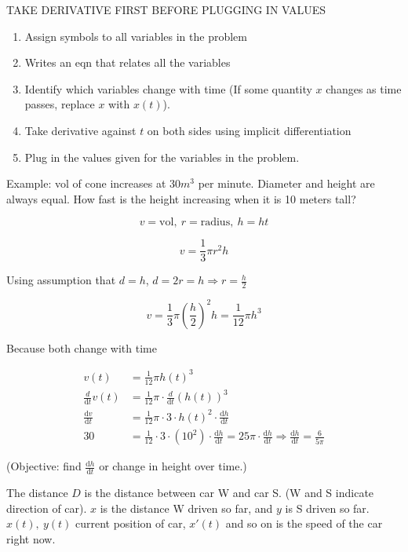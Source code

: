 \documentclass[12pt]{article}
\theoremstyle{plain}
\theoremstyle{remark}
\theoremstyle{definition}
\begin{document}
TAKE DERIVATIVE FIRST BEFORE PLUGGING IN VALUES

\begin{enumerate}
\def\labelenumi{\arabic{enumi}.}
\item
  Assign symbols to all variables in the problem
\item
  Writes an eqn that relates all the variables
\item
  Identify which variables change with time (If some quantity \(x\)
  changes as time passes, replace \(x\) with \(x(t)\)).
\item
  Take derivative against \(t\) on both sides using implicit
  differentiation
\item
  Plug in the values given for the variables in the problem.
\end{enumerate}

Example: vol of cone increases at 30\(m^{3}\) per minute. Diameter and
height are always equal. How fast is the height increasing when it is 10
meters tall?

\[v = \text{vol},\ r = \text{radius},\ h = ht\]

\[v = \frac{1}{3}\pi r^{2}h\]

Using assumption that \(d = h\),
\(d = 2r = h \Rightarrow r = \frac{h}{2}\)

\[v = \frac{1}{3}\pi\left( \frac{h}{2} \right)^{2}h = \frac{1}{12}\pi h^{3}\]

Because both change with time

\begin{align*}
v(t) &= \frac{1}{12}\pi{h(t)}^{3} \\
\frac{d}{\text{d}t}v(t) &= \frac{1}{12}\pi \cdot \frac{d}{\text{d}t}\left( h(t) \right)^{3} \\
\frac{\text{d}v}{\text{d}t} &= \frac{1}{12}\pi \cdot 3 \cdot h(t)^{2} \cdot \frac{\text{d}h}{\text{d}t} \\
30 &= \frac{1}{12} \cdot 3 \cdot \left( 10^{2} \right) \cdot \frac{\text{d}h}{\text{d}t} = 25\pi \cdot \frac{\text{d}h}{\text{d}t} \Rightarrow \frac{\text{d}h}{\text{d}t} = \frac{6}{5\pi}
\end{align*}


(Objective: find \(\frac{\text{d}h}{\text{d}t}\) or change in height
over time.)


The distance \(D\) is the distance between car W and car S. (W and S
indicate direction of car). \(x\) is the distance W driven so far, and
\(y\) is S driven so far. \(x(t),\ y(t)\) current position of car,
\(x'(t)\) and so on is the speed of the car right now.
\end{document}
